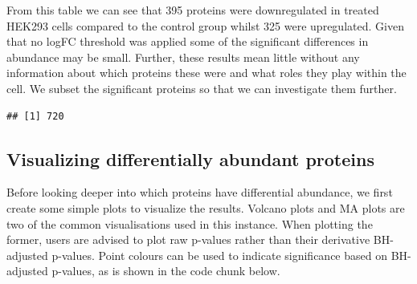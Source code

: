 \documentclass[9pt,a4paper,]{extarticle}
\newenvironment{Shaded}{\begin{snugshade}}{\end{snugshade}}
\newcommand{\DocumentationTok}[1]{\textcolor[rgb]{0.56,0.35,0.01}{\textbf{\textit{#1}}}}
\newcommand{\FloatTok}[1]{\textcolor[rgb]{0.00,0.00,0.81}{#1}}
\newcommand{\FunctionTok}[1]{\textcolor[rgb]{0.13,0.29,0.53}{\textbf{#1}}}
\newcommand{\NormalTok}[1]{#1}
\newcommand{\OtherTok}[1]{\textcolor[rgb]{0.56,0.35,0.01}{#1}}
\newcommand{\SpecialCharTok}[1]{\textcolor[rgb]{0.81,0.36,0.00}{\textbf{#1}}}
\begin{document}
From this table we can see that 395 proteins were downregulated
in treated HEK293 cells compared to the control group whilst 325
were upregulated. Given that no logFC threshold was applied some of the significant
differences in abundance may be small. Further, these results mean little without
any information about which proteins these were and what roles they play within
the cell. We subset the significant proteins so that we can investigate them
further.

\begin{Shaded}
\end{Shaded}

\begin{verbatim}
## [1] 720
\end{verbatim}

\hypertarget{visualizing-differentially-abundant-proteins}{%
\subsection{Visualizing differentially abundant proteins}\label{visualizing-differentially-abundant-proteins}}

Before looking deeper into which proteins have differential abundance, we first
create some simple plots to visualize the results. Volcano plots and MA plots
are two of the common visualisations used in this instance. When plotting the
former, users are advised to plot raw p-values rather than their derivative
BH-adjusted p-values. Point colours can be used to indicate significance based
on BH- adjusted p-values, as is shown in the code chunk below.
\end{document}
